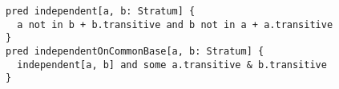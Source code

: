 \lstset{frame=tb, aboveskip=12pt, belowskip=-3pt, breaklines=true, basicstyle=\small\ttfamily, tabsize=2, mathescape=true}
\begin{lstlisting}[caption={base\_facts.als, lines 54-59}, label=alloy:mutually-independent, captionpos=b]
pred independent[a, b: Stratum] {
  a not in b + b.transitive and b not in a + a.transitive
}
pred independentOnCommonBase[a, b: Stratum] {
  independent[a, b] and some a.transitive & b.transitive
}
\end{lstlisting}
